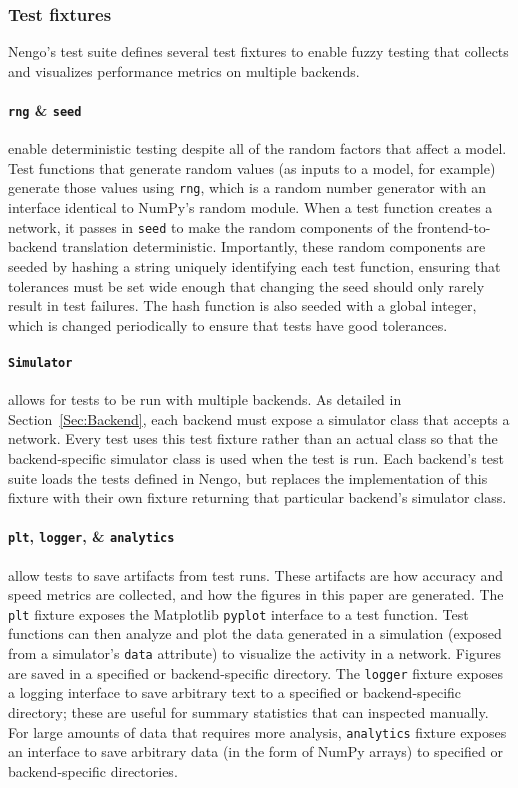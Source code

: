 \documentclass{frontiersSCNS}
\begin{document}
\subsubsection{Test fixtures}

Nengo's test suite defines several test fixtures
to enable fuzzy testing
that collects and visualizes performance metrics
on multiple backends.

\paragraph{\texttt{rng} \& \texttt{seed}}
enable deterministic testing despite
all of the random factors that affect a model.
Test functions that generate random values
(as inputs to a model, for example)
generate those values using \texttt{rng},
which is a random number generator
with an interface identical to
NumPy's random module.
When a test function creates a network,
it passes in \texttt{seed} to make
the random components
of the frontend-to-backend translation deterministic.
Importantly, these random components
are seeded by hashing a string uniquely
identifying each test function,
ensuring that tolerances must be set
wide enough that changing the seed
should only rarely result in test failures.
The hash function is also seeded
with a global integer,
which is changed periodically to ensure
that tests have good tolerances.

\paragraph{\texttt{Simulator}}
allows for tests to be run with multiple backends.
As detailed in Section~\ref{Sec:Backend},
each backend must expose a simulator class
that accepts a network.
Every test uses this test fixture rather than
an actual class so that
the backend-specific simulator class is used
when the test is run.
Each backend's test suite loads
the tests defined in Nengo,
but replaces the implementation of
this fixture with their own fixture
returning that particular backend's simulator class.

\paragraph{\texttt{plt}, \texttt{logger}, \& \texttt{analytics}}
allow tests to save artifacts from test runs.
These artifacts are how accuracy and speed metrics
are collected, and how the figures
in this paper are generated.
The \texttt{plt} fixture exposes the Matplotlib \cite{hunter2007}
\texttt{pyplot} interface to a test function.
Test functions can then analyze and plot
the data generated in a simulation
(exposed from a simulator's \texttt{data} attribute)
to visualize the activity in a network.
Figures are saved in a specified or backend-specific directory.
The \texttt{logger} fixture exposes a logging interface
to save arbitrary text to a specified
or backend-specific directory;
these are useful for summary statistics
that can inspected manually.
For large amounts of data that
requires more analysis,
\texttt{analytics} fixture exposes an interface
to save arbitrary data (in the form of NumPy arrays)
to specified or backend-specific directories.
\end{document}
